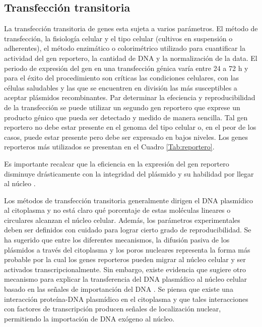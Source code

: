 \documentclass[fleqn,10pt]{SelfArx} %
\begin{document}
\subsection{Transfección transitoria}
La transfección transitoria de genes esta sujeta a varios parámetros. El método de transfección, la fisiología celular y el tipo celular (cultivos en suspensión o adherentes), el método enzimático o colorimétrico utilizado para cuantificar la actividad del gen reportero, la cantidad de DNA y la normalización de la data. El periodo de expresión del gen en una transfección génica varía entre 24 a 72 h y para el éxito del procedimiento son críticas las condiciones celulares, con las  células saludables y las que se encuentren en división las más susceptibles a aceptar plásmidos recombinantes. Par determinar la efeciencia y reproducibilidad de la transfección se puede utilizar un segundo gen reportero que exprese un producto génico que pueda ser detectado y medido de manera sencilla. Tal gen reportero no debe estar presente en el genoma del tipo celular o, en el peor de los casos, puede estar presente pero debe ser expresado en bajos niveles. Los genes reporteros más utilizados se presentan en el Cuadro \ref{Tab:reportero}.

Es importante recalcar que la eficiencia en la expresión del gen reportero disminuye drásticamente con la  integridad del plásmido y su habilidad por llegar al núcleo \cite{Zohar:2001aa}. 

Los métodos de transfección transitoria generalmente dirigen el DNA plasmídico al citoplasma y no está claro qué porcentaje de estas moléculas lineares o circulares alcanzan el núcleo celular. Además, los parámetros experimentales deben ser definidos con cuidado para lograr cierto grado de reproducibilidad. Se ha sugerido que entre los diferentes mecanismos, la difusión pasiva de los plásmidos a través del citoplasma y los poros nucleares representa la forma más probable por la cual los genes reporteros  pueden migrar al núcleo celular y ser activados transcripcionalmente.  Sin embargo, existe evidencia que sugiere otro mecanismo para explicar la transferencia del DNA plasmídico al núcleo celular basado en las señales de importanción del DNA \cite{Vacik:1999aa, Zohar:2001aa}. Se piensa que existe una interacción proteína-DNA plasmídico en el citoplasma y que tales interacciones con factores de transcripción producen señales de localización nuclear, permitiendo la importación de DNA exógeno al núcleo.
\end{document}
